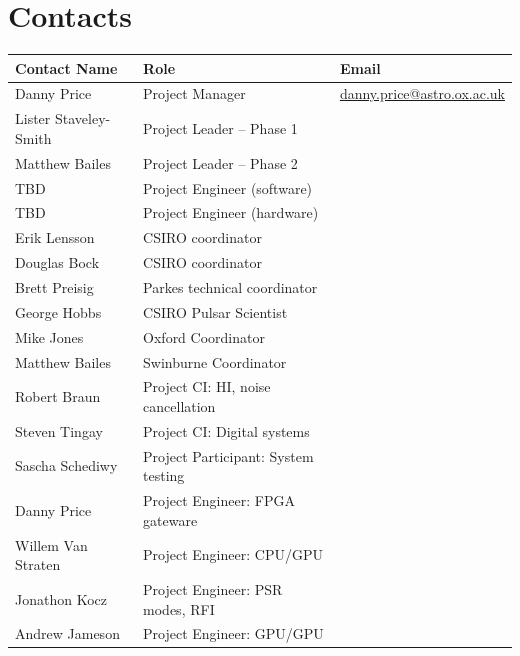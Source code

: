 \documentclass[letterpaper,10pt,english]{sphinxmanual}
\begin{document}
\chapter{Contacts}
\label{contacts::doc}\label{contacts:contacts}
\begin{tabulary}{\linewidth}{|L|L|L|}
\hline
\textbf{\relax 
Contact Name
} & \textbf{\relax 
Role
} & \textbf{\relax 
Email
}\\\hline

Danny Price
 & 
Project Manager
 & 
\href{mailto:danny.price@astro.ox.ac.uk}{danny.price@astro.ox.ac.uk}
\\\hline

Lister Staveley-Smith
 & 
Project Leader – Phase 1
 & \\\hline

Matthew Bailes
 & 
Project Leader – Phase 2
 & \\\hline

TBD
 & 
Project Engineer (software)
 & \\\hline

TBD
 & 
Project Engineer (hardware)
 & \\\hline

Erik Lensson
 & 
CSIRO coordinator
 & \\\hline

Douglas Bock
 & 
CSIRO coordinator
 & \\\hline

Brett Preisig
 & 
Parkes technical coordinator
 & \\\hline

George Hobbs
 & 
CSIRO Pulsar Scientist
 & \\\hline

Mike Jones
 & 
Oxford Coordinator
 & \\\hline

Matthew Bailes
 & 
Swinburne Coordinator
 & \\\hline

Robert Braun
 & 
Project CI: HI, noise cancellation
 & \\\hline

Steven Tingay
 & 
Project CI: Digital systems
 & \\\hline

Sascha Schediwy
 & 
Project Participant: System testing
 & \\\hline

Danny Price
 & 
Project Engineer: FPGA gateware
 & \\\hline

Willem Van Straten
 & 
Project Engineer: CPU/GPU
 & \\\hline

Jonathon Kocz
 & 
Project Engineer: PSR modes, RFI
 & \\\hline

Andrew Jameson
 & 
Project Engineer: GPU/GPU
 & \\\hline
\end{tabulary}
\end{document}
